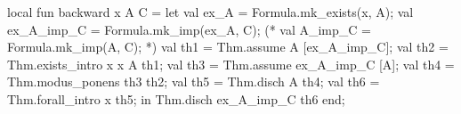 \nwenddocs{}\plusendmoddef\nwstartdeflinemarkup{}\nwenddeflinemarkup
local
fun backward x A C =
  let
    val ex_A = Formula.mk_exists(x, A);
    val ex_A_imp_C = Formula.mk_imp(ex_A, C);
    (* val A_imp_C = Formula.mk_imp(A, C); *)
    val th1 = Thm.assume A [ex_A_imp_C];
    val th2 = Thm.exists_intro x x A th1;
    val th3 = Thm.assume ex_A_imp_C [A];
    val th4 = Thm.modus_ponens th3 th2;
    val th5 = Thm.disch A th4;
    val th6 = Thm.forall_intro x th5;
  in
    Thm.disch ex_A_imp_C th6
  end;

